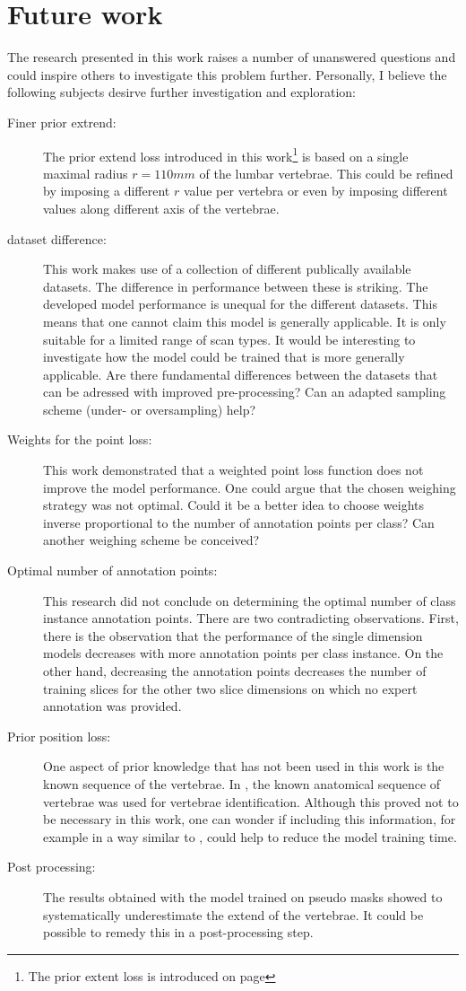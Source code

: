 \chapter{Future work}
The research presented in this work raises a number of unanswered questions and could inspire others to investigate this problem further.
Personally, I believe the following subjects desirve further investigation and exploration:
\begin{description}
    \item[Finer prior extrend:] The prior extend loss introduced in this work\footnote{The prior extent loss is introduced on page \pageref{fig:prior_extent}} is based on a single maximal radius $r=110mm$ 
    of the lumbar vertebrae. This could be refined by imposing a different $r$ value per vertebra or even by imposing different values along different axis of the vertebrae.
    \item[dataset difference:] This work makes use of a collection of different publically available datasets. The difference in performance between these is striking.
    The developed model performance is unequal for the different datasets. This means that one cannot claim this model is generally applicable. It is only suitable for a limited range of scan types.
    It would be interesting to investigate how the model could be trained that is more generally applicable. Are there fundamental differences between the datasets that can be adressed with improved pre-processing?
    Can an adapted sampling scheme (under- or oversampling) help? 
    \item[Weights for the point loss:] This work demonstrated that a weighted point loss function does not improve the model performance. One could argue that the chosen weighing strategy was not optimal.
    Could it be a better idea to choose weights inverse proportional to the number of annotation points per class? Can another weighing scheme be conceived? 
    \item[Optimal number of annotation points:] This research did not conclude on determining the optimal number of class instance annotation points. There are two contradicting observations.
    First, there is the observation that the performance of the single dimension models decreases with more annotation points per class instance. 
    On the other hand, decreasing the annotation points decreases the number of training slices for the other two slice dimensions on which no expert annotation was provided.
    \item[Prior position loss:] One aspect of prior knowledge that has not been used in this work is the known sequence of the vertebrae. In \cite{Lessmann2018}, 
    the known anatomical sequence of vertebrae was used for vertebrae identification.
    Although this proved not to be necessary in this work, one can wonder if including this information, for example in a way similar to \cite{Lessmann2018}, could help to reduce the model training time.
    \item[Post processing:] The results obtained with the model trained on pseudo masks showed to systematically underestimate the extend of the vertebrae.
    It could be possible to remedy this in a post-processing step. 
\end{description}